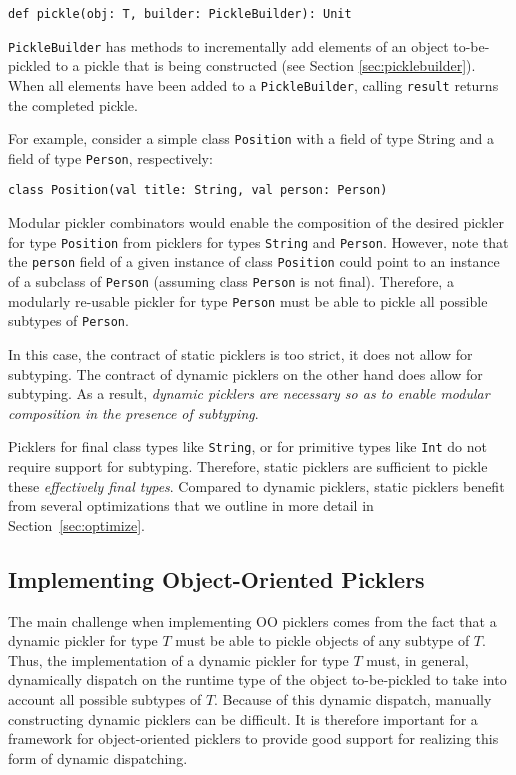 \documentclass[preprint,10pt]{sigplanconf}
\theoremstyle{definition}
\newcommand{\term}[1]{\mbox{\texttt{#1}}}
\begin{document}
\begin{lstlisting}
def pickle(obj: T, builder: PickleBuilder): Unit
\end{lstlisting}

\verb|PickleBuilder| has methods to incrementally add elements of an object
to-be-pickled to a pickle that is being constructed (see Section
\ref{sec:picklebuilder}). When all elements have been added to a
\verb|PickleBuilder|, calling \verb|result| returns the completed pickle.

For example, consider a simple class \verb|Position| with a field of type
String and a field of type \term{Person}, respectively:

\begin{lstlisting}
class Position(val title: String, val person: Person)
\end{lstlisting}

Modular pickler combinators would enable the composition of the desired
pickler for type \term{Position} from picklers for types \term{String} and
\term{Person}. However, note that the \term{person} field of a given instance
of class \term{Position} could point to an instance of a subclass of
\term{Person} (assuming class \term{Person} is not final). Therefore, a
modularly re-usable pickler for type \term{Person} must be able to pickle all
possible subtypes of \term{Person}.

In this case, the contract of static picklers is too strict, it does not allow
for subtyping. The contract of dynamic picklers on the other hand does allow
for subtyping. As a result, {\em dynamic picklers are necessary so as to enable
modular composition in the presence of subtyping}.

Picklers for final class types like \term{String}, or for primitive types like
\term{Int} do not require support for subtyping. Therefore, static picklers
are sufficient to pickle these {\em effectively final types}. Compared to
dynamic picklers, static picklers benefit from several optimizations that we
outline in more detail in Section~\ref{sec:optimize}.

\subsection{Implementing Object-Oriented Picklers}

The main challenge when implementing OO picklers comes from the fact that a
dynamic pickler for type $T$ must be able to pickle objects of any subtype of
$T$. Thus, the implementation of a dynamic pickler for type $T$ must, in
general, dynamically dispatch on the runtime type of the object to-be-pickled
to take into account all possible subtypes of $T$. Because of this dynamic
dispatch, manually constructing dynamic picklers can be difficult. It is
therefore important for a framework for object-oriented picklers to provide
good support for realizing this form of dynamic dispatching.
\end{document}
